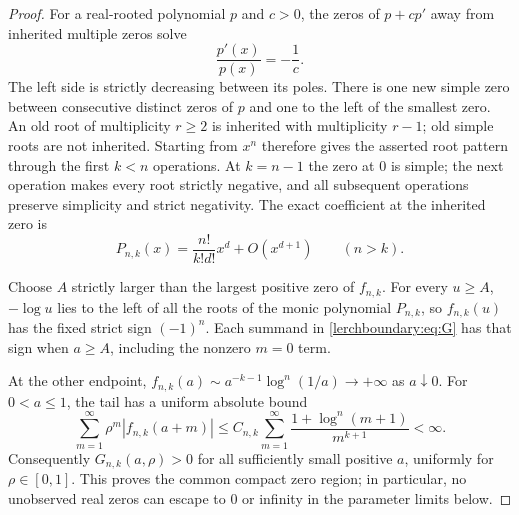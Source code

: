 \begin{proof}
For a real-rooted polynomial $p$ and $c>0$, the zeros of $p+cp'$ away
from inherited multiple zeros solve
\[
 \frac{p'(x)}{p(x)}=-\frac1c.
\]
The left side is strictly decreasing between its poles.  There is one
new simple zero between consecutive distinct zeros of $p$ and one to
the left of the smallest zero.  An old root of multiplicity $r\geq2$
is inherited with multiplicity $r-1$; old simple roots are not inherited.
Starting from $x^n$ therefore gives the asserted root pattern through
the first $k<n$ operations.  At $k=n-1$ the zero at $0$ is simple; the
next operation makes every root strictly negative, and all subsequent
operations preserve simplicity and strict negativity.  The exact
coefficient at the inherited zero is
\begin{equation}\label{lerchboundary:eq:leading}
 P_{n,k}(x)=\frac{n!}{k!d!}x^d+O(x^{d+1})\qquad(n>k).
\end{equation}

Choose $A$ strictly larger than the largest positive zero of $f_{n,k}$.
For every $u\geq A$, $-\log u$ lies to the left of all the roots of the
monic polynomial $P_{n,k}$, so $f_{n,k}(u)$ has the fixed strict sign
$(-1)^n$.  Each summand in \eqref{lerchboundary:eq:G} has that sign
when $a\geq A$, including the nonzero $m=0$ term.

At the other endpoint, $f_{n,k}(a)\sim a^{-k-1}\log^n(1/a)\to+\infty$
as $a\downarrow0$.  For $0<a\leq1$, the tail has a uniform absolute bound
\[
 \sum_{m=1}^{\infty}\rho^m|f_{n,k}(a+m)|
 \leq C_{n,k}\sum_{m=1}^{\infty}
       \frac{1+\log^n(m+1)}{m^{k+1}}<\infty.
\]
Consequently $G_{n,k}(a,\rho)>0$ for all sufficiently small positive
$a$, uniformly for $\rho\in[0,1]$.  This proves the common compact
zero region; in particular, no unobserved real zeros can escape to
$0$ or infinity in the parameter limits below.
\end{proof}

